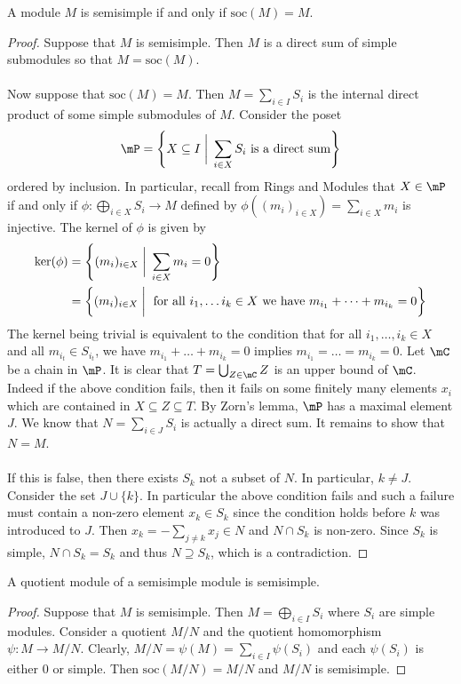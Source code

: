 \documentclass[a4paper]{article}
\begin{document}
\begin{thm}{}{} A module $M$ is semisimple if and only if $\text{soc}(M)=M$. 
\begin{proof}
Suppose that $M$ is semisimple. Then $M$ is a direct sum of simple submodules so that $M=\text{soc}(M)$. \\~\\

Now suppose that $\text{soc}(M)=M$. Then $M=\sum_{i\in I}S_i$ is the internal direct product of some simple submodules of $M$. Consider the poset $$\mP=\left\{X\subseteq I\;\bigg{|}\;\sum_{i\in X}S_i\text{ is a direct sum}\right\}$$ ordered by inclusion. In particular, recall from Rings and Modules that $X\in\mP$ if and only if $\phi:\bigoplus_{i\in X}S_i\to M$ defined by $\phi\left((m_i)_{i\in X}\right)=\sum_{i\in X}m_i$ is injective. The kernel of $\phi$ is given by 
\begin{align*}
\ker(\phi)&=\left\{(m_i)_{i\in X}\;\bigg{|}\;\sum_{i\in X}m_i=0\right\}\\
&=\left\{(m_i)_{i\in X}\;\bigg{|}\;\text{ for all }i_1,\dots i_k\in X\text{ we have }m_{i_1}+\dots+m_{i_k}=0\right\}
\end{align*}
The kernel being trivial is equivalent to the condition that for all $i_1,\dots,i_k\in X$ and all $m_{i_t}\in S_{i_t}$, we have $m_{i_1}+\dots+m_{i_k}=0$ implies $m_{i_1}=\dots=m_{i_k}=0$. Let $\mC$ be a chain in $\mP$. It is clear that $T=\bigcup_{Z\in\mC}Z$ is an upper bound of $\mC$. Indeed if the above condition fails, then it fails on some finitely many elements $x_i$ which are contained in $X\subseteq Z\subseteq T$. By Zorn's lemma, $\mP$ has a maximal element $J$. We know that $N=\sum_{i\in J}S_i$ is actually a direct sum. It remains to show that $N=M$. \\~\\

If this is false, then there exists $S_k$ not a subset of $N$. In particular, $k\neq J$. Consider the set $J\cup\{k\}$. In particular the above condition fails and such a failure must contain a non-zero element $x_k\in S_k$ since the condition holds before $k$ was introduced to $J$. Then $x_k=-\sum_{j\neq k}x_j\in N$ and $N\cap S_k$ is non-zero. Since $S_k$ is simple, $N\cap S_k=S_k$ and thus $N\supseteq S_k$, which is a contradiction. 
\end{proof}
\end{thm}

\begin{crl}{}{} A quotient module of a semisimple module is semisimple. 
\begin{proof}
Suppose that $M$ is semisimple. Then $M=\bigoplus_{i\in I}S_i$ where $S_i$ are simple modules. Consider a quotient $M/N$ and the quotient homomorphism $\psi:M\to M/N$. Clearly, $M/N=\psi(M)=\sum_{i\in I}\psi(S_i)$ and each $\psi(S_i)$ is either $0$ or simple. Then $\text{soc}(M/N)=M/N$ and $M/N$ is semisimple. 
\end{proof}
\end{crl}
\end{document}
